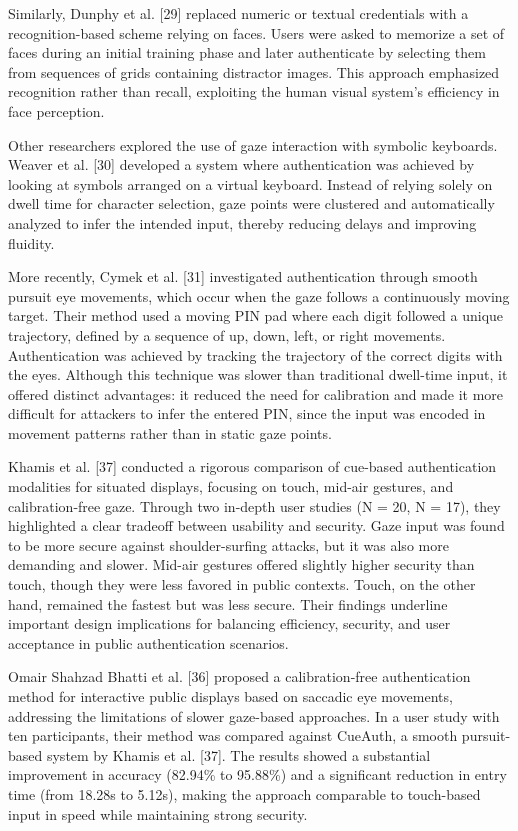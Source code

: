 \documentclass[12pt]{report}
\begin{document}
Similarly, Dunphy et al. [29] replaced numeric or textual credentials with a recognition-based scheme relying on faces. 
Users were asked to memorize a set of faces during an initial training phase and later authenticate by selecting them from sequences of grids containing distractor images. This approach emphasized recognition rather than recall, exploiting the human visual system's efficiency in face perception.

Other researchers explored the use of gaze interaction with symbolic keyboards. 
Weaver et al. [30] developed a system where authentication was achieved by looking at symbols arranged on a virtual keyboard.
Instead of relying solely on dwell time for character selection, gaze points were clustered and automatically analyzed to infer the intended input, thereby reducing delays and improving fluidity.

More recently, Cymek et al. [31] investigated authentication through smooth pursuit eye movements, which occur when the gaze follows a continuously moving target.
Their method used a moving PIN pad where each digit followed a unique trajectory, defined by a sequence of up, down, left, or right movements.
Authentication was achieved by tracking the trajectory of the correct digits with the eyes. 
Although this technique was slower than traditional dwell-time input, it offered distinct advantages: it reduced the need for calibration and made it more difficult for attackers to infer the entered PIN, since the input was encoded in movement patterns rather than in static gaze points.

Khamis et al. [37] conducted a rigorous comparison of cue-based authentication modalities for situated displays, focusing on touch, mid-air gestures, and calibration-free gaze. 
Through two in-depth user studies (N = 20, N = 17), they highlighted a clear tradeoff between usability and security. 
Gaze input was found to be more secure against shoulder-surfing attacks, but it was also more demanding and slower.
Mid-air gestures offered slightly higher security than touch, though they were less favored in public contexts.
Touch, on the other hand, remained the fastest but was less secure.
Their findings underline important design implications for balancing efficiency, security, and user acceptance in public authentication scenarios.

Omair Shahzad Bhatti et al. [36] proposed a calibration-free authentication method for interactive public displays based on saccadic eye movements, addressing the limitations of slower gaze-based approaches. 
In a user study with ten participants, their method was compared against CueAuth, a smooth pursuit-based system by Khamis et al. [37].
The results showed a substantial improvement in accuracy (82.94\% to 95.88\%) and a significant reduction in entry time (from 18.28s to 5.12s), making the approach comparable to touch-based input in speed while maintaining strong security.
\end{document}
